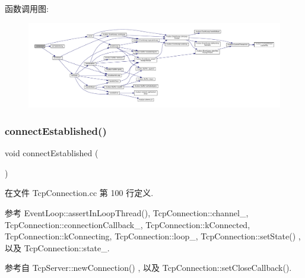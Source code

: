 函数调用图\+:
\nopagebreak
\begin{figure}[H]
\begin{center}
\leavevmode
\includegraphics[width=350pt]{classmuduo_1_1TcpConnection_aa0fd96bc25e3d509fb54028c2e4b91f6_cgraph}
\end{center}
\end{figure}
\mbox{\label{classmuduo_1_1TcpConnection_a2e1f9742dac98a0c3e5a5509920934ae}} 
\subsubsection{\texorpdfstring{connect\+Established()}{connectEstablished()}}
{\footnotesize\ttfamily void connect\+Established (\begin{DoxyParamCaption}{ }\end{DoxyParamCaption})}



在文件 Tcp\+Connection.\+cc 第 100 行定义.



参考 Event\+Loop\+::assert\+In\+Loop\+Thread(), Tcp\+Connection\+::channel\+\_\+, Tcp\+Connection\+::connection\+Callback\+\_\+, Tcp\+Connection\+::k\+Connected, Tcp\+Connection\+::k\+Connecting, Tcp\+Connection\+::loop\+\_\+, Tcp\+Connection\+::set\+State() , 以及 Tcp\+Connection\+::state\+\_\+.



参考自 Tcp\+Server\+::new\+Connection() , 以及 Tcp\+Connection\+::set\+Close\+Callback().

